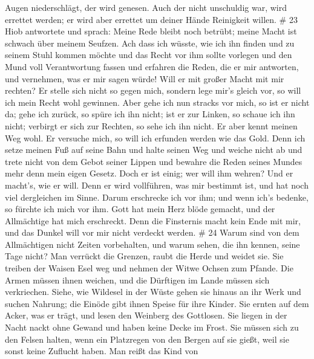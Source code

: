 Augen niederschlägt, der wird genesen.  Auch der nicht
unschuldig war, wird errettet werden; er wird aber errettet um deiner
Hände Reinigkeit willen. \# 23  Hiob antwortete und sprach:
 Meine Rede bleibt noch betrübt; meine Macht ist schwach
über meinem Seufzen.  Ach dass ich wüsste, wie ich ihn
finden und zu seinem Stuhl kommen möchte  und das Recht vor
ihm sollte vorlegen und den Mund voll Verantwortung fassen 
und erfahren die Reden, die er mir antworten, und vernehmen, was er mir
sagen würde!  Will er mit großer Macht mit mir rechten? Er
stelle sich nicht so gegen mich,  sondern lege mir's gleich
vor, so will ich mein Recht wohl gewinnen.  Aber gehe ich
nun stracks vor mich, so ist er nicht da; gehe ich zurück, so spüre ich
ihn nicht;  ist er zur Linken, so schaue ich ihn nicht;
verbirgt er sich zur Rechten, so sehe ich ihn nicht.  Er
aber kennt meinen Weg wohl. Er versuche mich, so will ich erfunden
werden wie das Gold.  Denn ich setze meinen Fuß auf seine
Bahn und halte seinen Weg und weiche nicht ab  und trete
nicht von dem Gebot seiner Lippen und bewahre die Reden seines Mundes
mehr denn mein eigen Gesetz.  Doch er ist einig; wer will
ihm wehren? Und er macht's, wie er will.  Denn er wird
vollführen, was mir bestimmt ist, und hat noch viel dergleichen im
Sinne.  Darum erschrecke ich vor ihm; und wenn ich's
bedenke, so fürchte ich mich vor ihm.  Gott hat mein Herz
blöde gemacht, und der Allmächtige hat mich erschreckt. 
Denn die Finsternis macht kein Ende mit mir, und das Dunkel will vor mir
nicht verdeckt werden. \# 24  Warum sind von dem
Allmächtigen nicht Zeiten vorbehalten, und warum sehen, die ihn kennen,
seine Tage nicht?  Man verrückt die Grenzen, raubt die Herde
und weidet sie.  Sie treiben der Waisen Esel weg und nehmen
der Witwe Ochsen zum Pfande.  Die Armen müssen ihnen
weichen, und die Dürftigen im Lande müssen sich verkriechen.
 Siehe, wie Wildesel in der Wüste gehen sie hinaus an ihr
Werk und suchen Nahrung; die Einöde gibt ihnen Speise für ihre Kinder.
 Sie ernten auf dem Acker, was er trägt, und lesen den
Weinberg des Gottlosen.  Sie liegen in der Nacht nackt ohne
Gewand und haben keine Decke im Frost.  Sie müssen sich zu
den Felsen halten, wenn ein Platzregen von den Bergen auf sie gießt,
weil sie sonst keine Zuflucht haben.  Man reißt das Kind von
